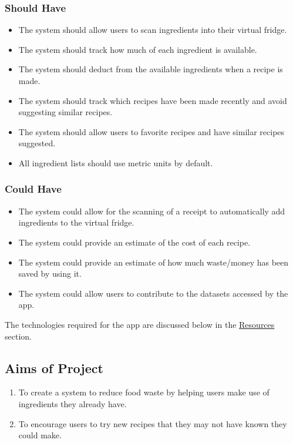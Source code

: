 \documentclass[../CHEFCookingHelperForEveryonesFridge.tex]{subfiles}
\begin{document}
\subsubsection{Should Have}
\begin{itemize}
    \item The system should allow users to scan ingredients into their virtual fridge.
    \item The system should track how much of each ingredient is available.
    \item The system should deduct from the available ingredients when a recipe is made.
    \item The system should track which recipes have been made recently and avoid suggesting similar recipes.
    \item The system should allow users to favorite recipes and have similar recipes suggested.
    \item All ingredient lists should use metric units by default.
\end{itemize}

\subsubsection{Could Have}
\begin{itemize}
    \item The system could allow for the scanning of a receipt to automatically add ingredients to the virtual fridge.
    \item The system could provide an estimate of the cost of each recipe.
    \item The system could provide an estimate of how much waste/money has been saved by using it.
    \item The system could allow users to contribute to the datasets accessed by the app.
\end{itemize}

The technologies required for the \chef{} app are discussed below in the \hyperref[sec:resources_statement]{Resources} section.

\subsection{Aims of Project}

\begin{enumerate}
    \item To create a system to reduce food waste by helping users make use of ingredients they already have.
    \item To encourage users to try new recipes that they may not have known they could make.
\end{enumerate}
\end{document}
